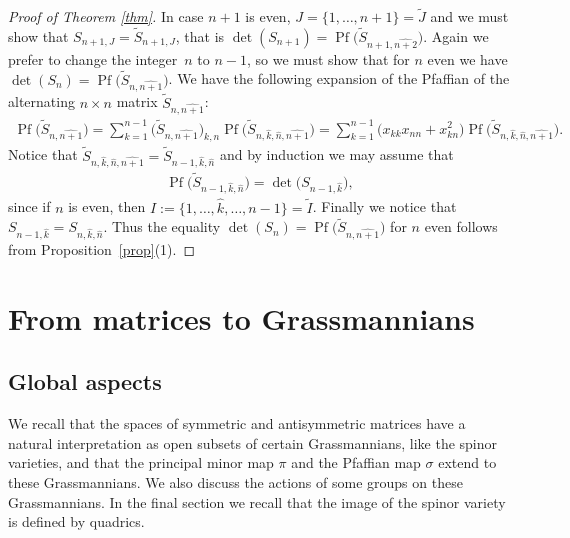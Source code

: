 \documentclass[pdftex]{sigma}
\newcommand{\tI}{{\tilde{I}}}
\newcommand{\tJ}{{\tilde{J}}}
\newcommand{\tS}{{\tilde{S}}}
\numberwithin{equation}{section}
\begin{document}
\begin{proof}[Proof of Theorem \ref{thm}]
In case $n+1$ is even, $J=\{1,\ldots,n+1\}=\tJ$ and we must show that $S_{n+1,{J}}=\tS_{n+1,{J}}$, that is $\det(S_{n+1})=\operatorname{Pf}\big(\tS_{n+1,\widehat{n+2}}\big)$. Again we prefer to change the integer~$n$ to $n-1$, so we must show that for $n$ even we have $\det(S_{n})=\operatorname{Pf}\big(\tS_{n,\widehat{n+1}}\big)$. We have the following expansion of the Pfaffian of the alternating $n\times n$ matrix $\tS_{n,\widehat{n+1}}$:
\begin{gather*}
\operatorname{Pf}\big(\tS_{n,\widehat{n+1}}\big) =
\sum_{k=1}^{n-1}\big(\tS_{n,\widehat{n+1}}\big)_{k,n}\operatorname{Pf}\big(\tS_{n,\hat{k},\hat{n},\widehat{n+1}}\big) =
\sum_{k=1}^{n-1} \big(x_{kk}x_{nn}+x_{kn}^2\big)\operatorname{Pf}\big(\tS_{n,\hat{k},\hat{n},\widehat{n+1}}\big).
\end{gather*}
Notice that $\tS_{n,\hat{k},\hat{n},\widehat{n+1}}=\tS_{n-1,\hat{k},\hat{n}}$ and by induction we may assume that
\begin{gather*} \operatorname{Pf}\big(\tS_{n-1,\hat{k},\hat{n}}\big)= \det\big(S_{n-1,\hat{k}}\big),
\end{gather*} since if $n$ is even, then $I:=\big\{1,\ldots,\hat{k},\ldots,n-1\big\}=\tI$. Finally we notice that $S_{n-1,\hat{k}}=S_{n,\hat{k},\hat{n}}$. Thus the equality $\det(S_{n})=\operatorname{Pf}\big(\tS_{n,\widehat{n+1}}\big)$ for $n$ even follows from Proposition~\ref{prop}(1).
\end{proof}

\section{From matrices to Grassmannians}

\subsection{Global aspects}
We recall that the spaces of symmetric and antisymmetric matrices have a natural interpretation as open subsets of certain Grassmannians, like the spinor varieties, and that the principal minor map $\pi$ and the Pfaffian map $\sigma$ extend to these Grassmannians. We also discuss the actions of some groups on these Grassmannians. In the final section we recall that the image of the spinor variety is defined by quadrics.
\end{document}
